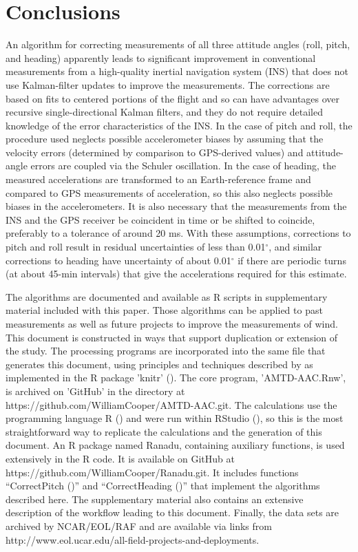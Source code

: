 \documentclass[english,british,amtd,bookmarks=false,unicode=true]{copernicus}\usepackage[]{graphicx}\usepackage[]{color}
\begin{document}
\section{Conclusions}



An algorithm for correcting measurements of all three attitude angles
(roll, pitch, and heading) apparently leads to significant improvement
in conventional measurements from a high-quality inertial navigation
system (INS) that does not use Kalman-filter updates to improve the
measurements. The corrections are based on fits to centered portions
of the flight and so can have advantages over recursive single-directional
Kalman filters, and they do not require detailed knowledge of the
error characteristics of the INS. In the case of pitch and roll, the
procedure used neglects possible accelerometer biases by assuming
that the velocity errors (determined by comparison to GPS-derived
values) and attitude-angle errors are coupled via the Schuler oscillation.
In the case of heading, the measured accelerations are transformed
to an Earth-reference frame and compared to GPS measurements of acceleration,
so this also neglects possible biases in the accelerometers. It is
also necessary that the measurements from the INS and the GPS receiver
be coincident in time or be shifted to coincide, preferably to a tolerance
of around 20 ms. With these assumptions, corrections to pitch and
roll result in residual uncertainties of less than 0.01$^{\circ}$,
and similar corrections to heading have uncertainty of about 0.01$^{\circ}$
if there are periodic turns (at about 45-min intervals) that give
the accelerations required for this estimate.

The algorithms are documented and available as R scripts in supplementary
material included with this paper. Those algorithms can be applied
to past measurements as well as future projects to improve the measurements
of wind. This document is constructed in ways that support duplication
or extension of the study. The processing programs are incorporated
into the same file that generates this document, using principles
and techniques described by \citet{Xie2014a} as implemented in the
R package \textquoteright knitr\textquoteright{} (\citet{Xie2014b}).
The core program, \textquoteright AMTD-AAC.Rnw\textquoteright , is
archived on \textquoteright GitHub\textquoteright{} in the directory
at https://github.com/WilliamCooper/AMTD-AAC.git. The calculations
use the programming language R (\citet{Rlanguage}) and were run within
RStudio (\citet{RStudio2012}), so this is the most straightforward
way to replicate the calculations and the generation of this document.
An R package named Ranadu, containing auxiliary functions, is used
extensively in the R code. It is available on GitHub at https://github.com/WilliamCooper/Ranadu.git.
It includes functions ``CorrectPitch ()'' and ``CorrectHeading
()'' that implement the algorithms described here. The supplementary
material also contains an extensive description of the workflow leading
to this document. Finally, the data sets are archived by NCAR/EOL/RAF
and are available via links from http://www.eol.ucar.edu/all-field-projects-and-deployments.
\end{document}
